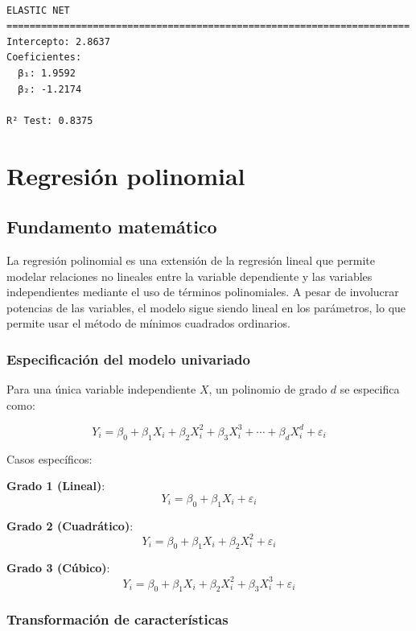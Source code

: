 \documentclass[
  doc,
  floatsintext,
  longtable,
  a4paper,
  nolmodern,
  notxfonts,
  notimes,
  12pt,
  colorlinks=true,linkcolor=blue,citecolor=blue,urlcolor=blue]{apa7}
\begin{document}
\begin{verbatim}

ELASTIC NET
======================================================================
Intercepto: 2.8637
Coeficientes:
  β₁: 1.9592
  β₂: -1.2174

R² Test: 0.8375
\end{verbatim}

\section{Regresión polinomial}\label{regresiuxf3n-polinomial}

\subsection{Fundamento matemático}\label{fundamento-matemuxe1tico-4}

La regresión polinomial es una extensión de la regresión lineal que
permite modelar relaciones no lineales entre la variable dependiente y
las variables independientes mediante el uso de términos polinomiales. A
pesar de involucrar potencias de las variables, el modelo sigue siendo
lineal en los parámetros, lo que permite usar el método de mínimos
cuadrados ordinarios.

\subsubsection{Especificación del modelo
univariado}\label{especificaciuxf3n-del-modelo-univariado}

Para una única variable independiente \(X\), un polinomio de grado \(d\)
se especifica como:

\[
Y_i = \beta_0 + \beta_1 X_i + \beta_2 X_i^2 + \beta_3 X_i^3 + \cdots + \beta_d X_i^d + \varepsilon_i
\]

Casos específicos:

\textbf{Grado 1 (Lineal)}: \[
Y_i = \beta_0 + \beta_1 X_i + \varepsilon_i
\]

\textbf{Grado 2 (Cuadrático)}: \[
Y_i = \beta_0 + \beta_1 X_i + \beta_2 X_i^2 + \varepsilon_i
\]

\textbf{Grado 3 (Cúbico)}: \[
Y_i = \beta_0 + \beta_1 X_i + \beta_2 X_i^2 + \beta_3 X_i^3 + \varepsilon_i
\]

\subsubsection{Transformación de
características}\label{transformaciuxf3n-de-caracteruxedsticas}
\end{document}
